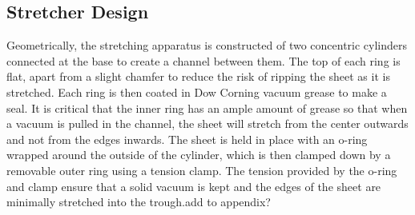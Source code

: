 \subsection{Stretcher Design}
Geometrically, the stretching apparatus is constructed of two concentric cylinders connected at the base to create a channel between them. The top of each ring is flat, apart from a slight chamfer to reduce the risk of ripping the sheet as it is stretched. Each ring is then coated in Dow Corning vacuum grease to make a seal. It is critical that the inner ring has an ample amount of grease so that when a vacuum is pulled in the channel, the sheet will stretch from the center outwards  and not from the edges inwards. The sheet is held in place with an o-ring wrapped around the outside of the cylinder, which is then clamped down by a removable outer ring using a tension clamp. The tension provided by the o-ring and clamp ensure that a solid vacuum is kept and the edges of the sheet are minimally stretched into the trough.add to appendix?  

